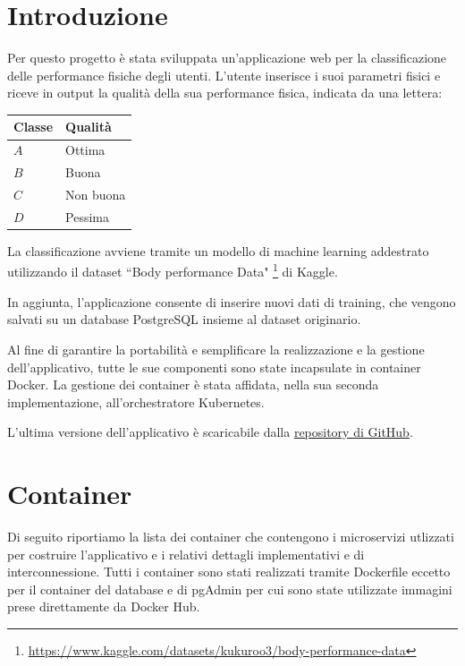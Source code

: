 \documentclass[12pt,a4paper]{report}
\begin{document}


\chapter{Introduzione}

Per questo progetto è stata sviluppata un'applicazione web
per la classificazione delle performance fisiche degli utenti.
L'utente inserisce i suoi parametri fisici e riceve in output
la qualità della sua performance fisica, indicata da una lettera:
\begin{table}[H]
  \centering
  \begin{tabular}{@{}ll@{}}
  \toprule
  \textbf{Classe} & \textbf{Qualità}   \\ \midrule
  $A$      & Ottima    \\
  $B$      & Buona     \\
  $C$      & Non buona \\
  $D$      & Pessima   \\ \bottomrule
  \end{tabular}
\end{table}

La classificazione avviene tramite un modello di machine learning
addestrato utilizzando il dataset ``Body performance Data"
\footnote{\url{https://www.kaggle.com/datasets/kukuroo3/body-performance-data}}
di Kaggle.

In aggiunta, l'applicazione consente di inserire nuovi dati di training,
che vengono salvati su un database PostgreSQL insieme al dataset originario.

Al fine di garantire la portabilità e semplificare
la realizzazione e la gestione dell'applicativo,
tutte le sue componenti sono state incapsulate in container Docker.
La gestione dei container è stata affidata,
nella sua seconda implementazione,
all'orchestratore Kubernetes.

L'ultima versione dell'applicativo è scaricabile dalla
\href{https://github.com/plspeziali/VNCCProject}{repository di GitHub}.

\chapter{Container}

Di seguito riportiamo la lista dei container
che contengono i microservizi utlizzati
per costruire l'applicativo e i relativi dettagli implementativi e di
interconnessione.
Tutti i container sono stati realizzati
tramite Dockerfile eccetto per il container del database e di
pgAdmin per cui sono state utilizzate immagini prese direttamente da
Docker Hub.
\end{document}
